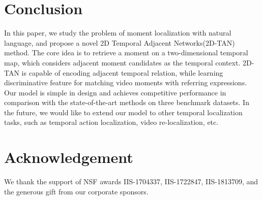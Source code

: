 \documentclass[letterpaper]{article} %
\begin{document}
\section{Conclusion}

In this paper, we study the problem of moment localization with natural language, and propose a novel
2D Temporal Adjacent Networks(2D-TAN) method.
The core idea is to retrieve a moment on a two-dimensional temporal map, which considers adjacent moment candidates as the temporal context. 2D-TAN is capable of encoding adjacent temporal relation, while learning discriminative feature for matching video moments with referring expressions.
Our model is simple in design and achieves  competitive performance in comparison with the state-of-the-art methods on three benchmark datasets.
In the future, we would like to extend our model to other temporal localization tasks, such as temporal action localization, video re-localization, etc. 

\section{Acknowledgement}
We thank the support of NSF awards IIS-1704337, IIS-1722847, IIS-1813709, and the generous gift from our corporate sponsors.



\end{document}
